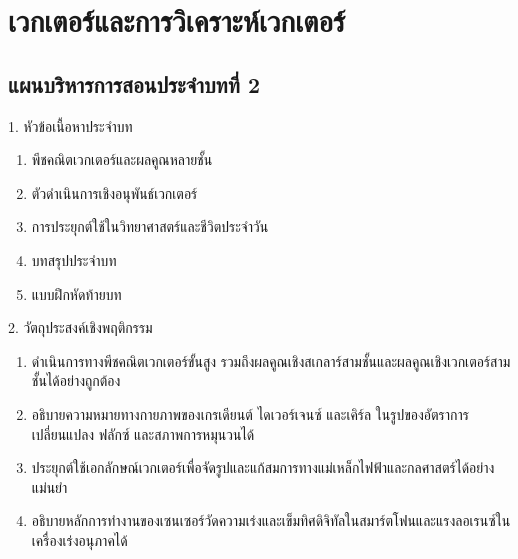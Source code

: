 \chapter{เวกเตอร์และการวิเคราะห์เวกเตอร์}

\section*{แผนบริหารการสอนประจำบทที่ 2}

\begin{planbox}[colframe=rbruNavy, colbacktitle=rbruNavy]{1. หัวข้อเนื้อหาประจำบท}
\begin{enumerate}[topsep=2pt, itemsep=1pt, partopsep=0pt, parsep=0pt, leftmargin=1.5em]
    \item พีชคณิตเวกเตอร์และผลคูณหลายชั้น
    \item ตัวดำเนินการเชิงอนุพันธ์เวกเตอร์
    \item การประยุกต์ใช้ในวิทยาศาสตร์และชีวิตประจำวัน
    \item บทสรุปประจำบท
    \item แบบฝึกหัดท้ายบท
\end{enumerate}
\end{planbox}

\begin{planbox}[colframe=rbruGreen, colbacktitle=rbruGreen]{2. วัตถุประสงค์เชิงพฤติกรรม}
\begin{enumerate}[topsep=2pt, itemsep=1pt, partopsep=0pt, parsep=0pt, leftmargin=1.5em]
    \item ดำเนินการทางพีชคณิตเวกเตอร์ขั้นสูง รวมถึงผลคูณเชิงสเกลาร์สามชั้นและผลคูณเชิงเวกเตอร์สามชั้นได้อย่างถูกต้อง
    \item อธิบายความหมายทางกายภาพของเกรเดียนต์ ไดเวอร์เจนซ์ และเคิร์ล ในรูปของอัตราการเปลี่ยนแปลง ฟลักซ์ และสภาพการหมุนวนได้
    \item ประยุกต์ใช้เอกลักษณ์เวกเตอร์เพื่อจัดรูปและแก้สมการทางแม่เหล็กไฟฟ้าและกลศาสตร์ได้อย่างแม่นยำ
    \item อธิบายหลักการทำงานของเซนเซอร์วัดความเร่งและเข็มทิศดิจิทัลในสมาร์ตโฟนและแรงลอเรนซ์ในเครื่องเร่งอนุภาคได้
\end{enumerate}
\end{planbox}


